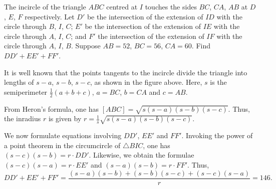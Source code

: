 \clearpage
\begin{question}[146]\label{A::2024-O-1-25}
    The incircle of the triangle $ABC$ centred at $I$ touches the sides $BC$, $CA$, $AB$ at $D$, $E$, $F$ respectively. Let $D'$ be the intersection of the extension of $ID$ with the circle through $B$, $I$, $C$; $E'$ be the intersection of the extension of $IE$ with the circle through $A$, $I$, $C$; and $F'$ the intersection of the extension of $IF$ with the circle through $A$, $I$, $B$. Suppose $AB = 52$, $BC = 56$, $CA = 60$. Find $DD' + EE' + FF'$.
\end{question}
\begin{center}
\end{center}
\begin{solution*}
    It is well known that the points tangents to the incircle divide the triangle into lengths of $s-a$, $s-b$, $s-c$, as shown in the figure above. Here, $s$ is the semiperimeter $\frac12(a+b+c)$, $a = BC$, $b = CA$ and $c = AB$.

    From Heron's formula, one has $[ABC] = \sqrt{s(s-a)(s-b)(s-c)}$. Thus, the inradius $r$ is given by $r = \frac1s \sqrt{s(s-a)(s-b)(s-c)}$.

    We now formulate equations involving $DD'$, $EE'$ and $FF'$. Invoking the power of a point theorem in the circumcircle of $\triangle BIC$, one has $(s-c)(s-b) = r \cdot DD'$. Likewise, we obtain the formulae $(s-c)(s-a) = r \cdot EE'$ and $(s-a)(s-b) = r \cdot FF'$. Thus, \[DD' + EE' + FF' = \frac{(s-a)(s-b) + (s-b)(s-c) + (s-c)(s-a)}r = 146.\]
\end{solution*}
